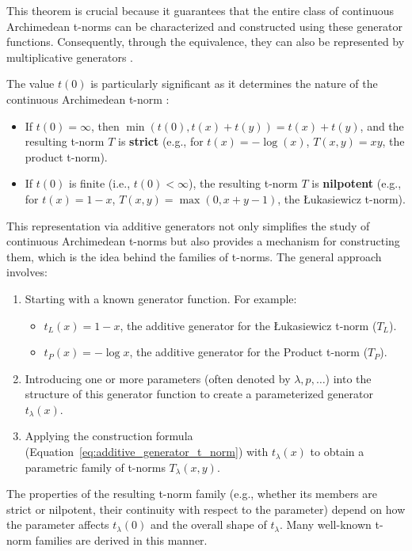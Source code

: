     This theorem is crucial because it guarantees that the entire class of continuous Archimedean t-norms can be characterized and constructed using these generator functions. Consequently, through the equivalence, they can also be represented by multiplicative generators \cite[Cor.~5.4]{Klement2000}.

The value $t(0)$ is particularly significant as it determines the nature of the continuous Archimedean t-norm \cite[Cor.~3.30]{Klement2000}:
\begin{itemize}
    \item If $t(0) = \infty$, then $\min(t(0), t(x) + t(y)) = t(x) + t(y)$, and the resulting t-norm $T$ is \textbf{strict} (e.g., for $t(x) = -\log(x)$, $T(x,y) = xy$, the product t-norm).
    \item If $t(0)$ is finite (i.e., $t(0) < \infty$), the resulting t-norm $T$ is \textbf{nilpotent} (e.g., for $t(x) = 1-x$, $T(x,y) = \max(0, x+y-1)$, the Łukasiewicz t-norm).
\end{itemize}
This representation via additive generators not only simplifies the study of continuous Archimedean t-norms but also provides a mechanism for constructing them, which is the idea behind the families of t-norms. The general approach involves:
\begin{enumerate}
    \item Starting with a known generator function. For example:
    \begin{itemize}
        \item $t_L(x) = 1-x$, the additive generator for the Łukasiewicz t-norm ($T_L$).
        \item $t_P(x) = -\log x$, the additive generator for the Product t-norm ($T_P$).
    \end{itemize}
    \item Introducing one or more parameters (often denoted by $\lambda, p, \dots$) into the structure of this generator function to create a parameterized generator $t_\lambda(x)$.
    \item Applying the construction formula (Equation~\eqref{eq:additive_generator_t_norm}) with $t_\lambda(x)$ to obtain a parametric family of t-norms $T_\lambda(x,y)$.
\end{enumerate}
The properties of the resulting t-norm family (e.g., whether its members are strict or nilpotent, their continuity with respect to the parameter) depend on how the parameter affects $t_\lambda(0)$ and the overall shape of $t_\lambda$. Many well-known t-norm families are derived in this manner.


